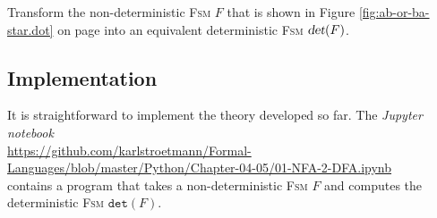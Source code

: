 \exerciseEng
Transform the non-deterministic \textsc{Fsm} $F$ that is shown in Figure \ref{fig:ab-or-ba-star.dot} on page
\pageref{fig:ab-or-ba-star.dot} 
into an equivalent deterministic \textsc{Fsm} $\textsl{det}(F)$. \eox

\subsection{Implementation}
It is straightforward to implement the theory developed so far. 
The \textsl{Jupyter notebook} 
\\[0.2cm]
\hspace*{0.3cm}
\href{https://github.com/karlstroetmann/Formal-Languages/blob/master/Python/Chapter-04-05/01-NFA-2-DFA.ipynb}{https://github.com/karlstroetmann/Formal-Languages/blob/master/Python/Chapter-04-05/01-NFA-2-DFA.ipynb}
\\[0.2cm]
contains a program that takes a non-deterministic \textsc{Fsm} $F$ and computes the deterministic \textsc{Fsm} $\mathtt{det}(F)$.


